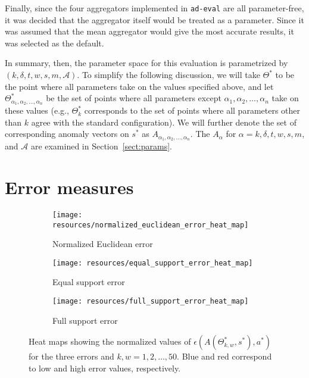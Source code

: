 Finally, since the four aggregators implemented in \texttt{ad-eval} are all parameter-free, it was decided that the aggregator itself would be treated as a parameter. Since it was assumed that the mean aggregator would give the most accurate results, it was selected as the default.

In summary, then, the parameter space for this evaluation is parametrized by $(k, \delta, t, w, s, m, \mathcal{A})$. To simplify the following discussion, we will take $\Theta^*$ to be the point where all parameters take on the values specified above, and let $\Theta^*_{\alpha_1, \alpha_2, \dots, \alpha_n}$ be the set of points where all parameters except $\alpha_1, \alpha_2, \dots, \alpha_n$ take on these values (e.g., $\Theta^*_k$ corresponds to the set of points where all parameters other than $k$ agree with the standard configuration). We will further denote the set of corresponding anomaly vectors on $s^*$ as $A_{\alpha_1, \alpha_2, \dots, \alpha_n}$. The $A_\alpha$ for $\alpha = k, \delta, t, w, s, m$, and $\mathcal{A}$ are examined in Section~\ref{sect:params}.

\section{Error measures}
\label{sect:error_measure_eval}

\begin{figure}[H]
    \centering
    \begin{subfigure}[b]{0.32\textwidth}
        \centering
        \texttt{[image: resources/normalized\_euclidean\_error\_heat\_map]}
        \caption{Normalized Euclidean error}
    \end{subfigure}
    \begin{subfigure}[b]{0.32\textwidth}
        \centering
        \texttt{[image: resources/equal\_support\_error\_heat\_map]}
        \caption{Equal support error}
    \end{subfigure}
    \begin{subfigure}[b]{0.32\textwidth}
        \centering
        \texttt{[image: resources/full\_support\_error\_heat\_map]}
        \caption{Full support error}
    \end{subfigure}
    \caption{Heat maps showing the normalized values of $\epsilon(A(\Theta_{k, w}^*, s^*), a^*)$ for the three errors and $k, w = 1,2,\dots,50$. Blue and red correspond to low and high error values, respectively.}
\label{fig:error_heat_maps}
    \vspace{-10pt}
\end{figure}


